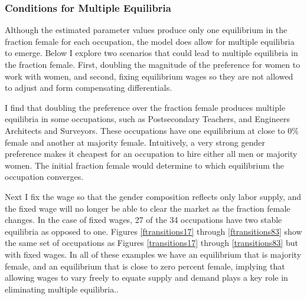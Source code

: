 \documentclass[12pt]{article}
\begin{document}

\subsubsection{Conditions for Multiple Equilibria}
Although the estimated parameter values produce only one equilibrium in the fraction female for each occupation, the model does allow for multiple equilibria to emerge. Below I explore two scenarios that could lead to multiple equilibria in the fraction female. First, doubling the magnitude of the preference for women to work with women, and second, fixing equilibrium wages so they are not allowed to adjust and form compensating differentials.


I find that doubling the preference over the fraction female produces multiple equilibria in some occupations, such as Postsecondary Teachers, and Engineers Architects and Surveyors. These occupations have one equilibrium at close to 0\% female and another at majority female. Intuitively, a very strong gender preference makes it cheapest for an occupation to hire either all men or majority women. The initial fraction female would determine to which equilibrium the occupation converges. 


Next I fix the wage so that the gender composition reflects only labor supply, and the fixed wage will no longer be able to clear the market as the fraction female changes. In the case of fixed wages, 27 of the 34 occupations have two stable equilibria as opposed to one. Figures \ref{ftransitions17} through \ref{ftransitions83} show the same set of occupations as Figures \ref{transitions17} through \ref{transitions83} but with fixed wages. In all of these examples we have an equilibrium that is majority female, and an equilibrium that is close to zero percent female, implying that allowing wages to vary freely to equate supply and demand plays a key role in eliminating multiple equilibria..
\end{document}
